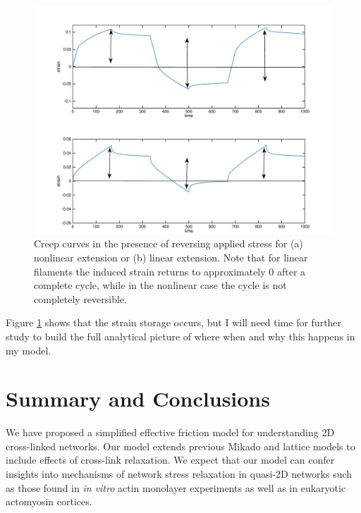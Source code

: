 \begin{figure}[h!]
\centering
\includegraphics[width=\hsize]{slippage/strain_mem_weak}
\caption{\label{fig:strain_mem_weak} Creep curves in the presence of reversing applied stress for (a) nonlinear extension or (b) linear extension.  Note that for linear filaments the induced strain returns to approximately 0 after a complete cycle, while in the nonlinear case the cycle is not completely reversible.}
\end{figure}

Figure \ref{fig:strain_mem_weak} shows that the strain storage occurs, but I will need time for further study to build the full analytical picture of where when and why this happens in my model.













\section{Summary and Conclusions}
We have proposed a simplified effective friction model for understanding 2D cross-linked networks. Our model extends previous Mikado and lattice models to include effects of cross-link relaxation. We expect that our model can confer insights into mechanisms of network stress relaxation in quasi-2D networks such as those found in \textit{in vitro} actin monolayer experiments\cite{rheo_2D1} as well as in eukaryotic actomyosin cortices\cite{cellmech_flows}.   


